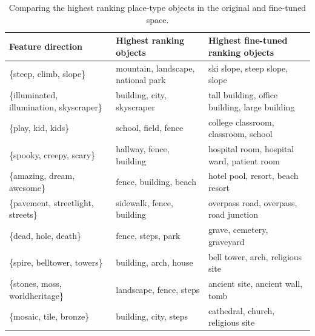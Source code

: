 \begin{table}[t]
	
	\centering
	\setlength{\tabcolsep}{8pt}
	\renewcommand{\arraystretch}{1.2}
	\footnotesize
	\begin{tabularx}{\textwidth}{l l l}
		\toprule
		\textbf{Feature direction} & Highest ranking objects & Highest fine-tuned ranking objects\\
		\midrule              
		\{steep, climb, slope\}                   & mountain, landscape, national park & ski slope, steep slope, slope                                     \\
		\{illuminated, illumination, skyscraper\} & building, city, skyscraper         & tall building, office building, large building                    \\
		\{play, kid, kids\}                       & school, field, fence               & college classroom, classroom, school                              \\
		\{spooky, creepy, scary\}          & hallway, fence, building             & hospital room, hospital ward, patient room                  \\
		\{amazing, dream, awesome\}                   & fence, building, beach    & hotel pool, resort, beach resort \\
		\{pavement, streetlight, streets\}        & sidewalk, fence, building          & overpass road, overpass, road junction                            \\
		\{dead, hole, death\}                     & fence, steps, park                 & grave, cemetery, graveyard                                        \\
		\{spire, belltower, towers\}              & building, arch, house              & bell tower, arch, religious site                                  \\
		\{stones, moss, worldheritage\}           & landscape, fence, steps            & ancient site, ancient wall, tomb                                  \\
		\{mosaic, tile, bronze\}                  & building, city, steps              & cathedral, church, religious site     \\
		\bottomrule
	\end{tabularx}
	
	\caption{Comparing the highest ranking place-type objects in the original and fine-tuned space. \label{tabTopRanked}}
\end{table}



